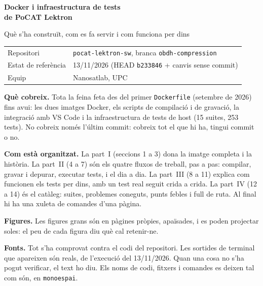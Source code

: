 \documentclass[11pt,a4paper]{article}
\DeclareRobustCommand{\_}{\textunderscore\allowbreak}
\newcommand{\cd}[1]{\texttt{#1}}
\begin{document}
\begin{titlepage}
\centering
\vspace*{2.2cm}
{\Huge\bfseries Docker i infraestructura de tests\\[6pt] de PoCAT Lektron\par}
\vspace{0.8cm}
{\Large Què s'ha construït, com es fa servir i com funciona per dins\par}
\vspace{1.5cm}
\begin{tabular}{@{}ll@{}}
Repositori & \cd{pocat-lektron-sw}, branca \cd{obdh-compression}\\
Estat de referència & 13/11/2026 (HEAD \cd{b233846} + canvis sense commit)\\
Equip & Nanosatlab, UPC\\
\end{tabular}
\vspace{1.4cm}

\begin{minipage}{0.86\textwidth}
\small
\textbf{Què cobreix.} Tota la feina feta des del primer \cd{Dockerfile} (setembre de 2026)
fins avui: les dues imatges Docker, els scripts de compilació i de gravació, la
integració amb VS Code i la infraestructura de tests de host (15 suites, 253 tests).
No cobreix només l'últim commit: cobreix tot el que hi ha, tingui commit o no.

\medskip
\textbf{Com està organitzat.} La part~I (seccions 1 a 3) dona la imatge completa i la
història. La part~II (4 a 7) són els quatre fluxos de treball, pas a pas: compilar,
gravar i depurar, executar tests, i el dia a dia. La part~III (8 a 11) explica com
funcionen els tests per dins, amb un test real seguit crida a crida. La part~IV
(12 a 14) és el catàleg: suites, problemes coneguts, punts febles i full de ruta.
Al final hi ha una xuleta de comandes d'una pàgina.

\medskip
\textbf{Figures.} Les figures grans són en pàgines pròpies, apaïsades, i es poden
projectar soles: el peu de cada figura diu què cal retenir-ne.

\medskip
\textbf{Fonts.} Tot s'ha comprovat contra el codi del repositori. Les sortides de
terminal que apareixen són reals, de l'execució del 13/11/2026. Quan una cosa
no s'ha pogut verificar, el text ho diu. Els noms de codi, fitxers i comandes es
deixen tal com són, en \cd{monoespai}.
\end{minipage}
\vfill
\end{titlepage}
\end{document}
